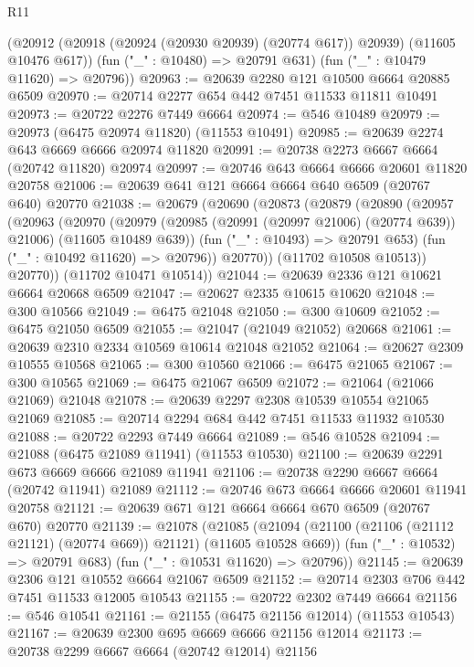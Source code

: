 \begin{lexlean}{R11}
\begin{coremodule}
{{{{{{{{{{{{{{{{{{{{{{{{{{{{{{{{{{{{{{{{{{{{{{{{{{{{{{{{{{{{{{{{{{{{{{{{{{{{{{{{{{      (@20912 (@20918 (@20924 (@20930 @20939) (@20774 @617)) @20939) (@11605 @10476 @617))
      (fun ("_" : @10480) => @20791 @631)
      (fun ("_" : @10479 @11620) => @20796))
@20963 := @20639 @2280 @121 @10500 @6664 @20885 @6509
@20970 := @20714 @2277 @654 @442 @7451 @11533 @11811 @10491
@20973 := @20722 @2276 @7449 @6664
@20974 := @546 @10489
@20979 := @20973 (@6475 @20974 @11820) (@11553 @10491)
@20985 := @20639 @2274 @643 @6669 @6666 @20974 @11820
@20991 := @20738 @2273 @6667 @6664 (@20742 @11820) @20974
@20997 := @20746 @643 @6664 @6666 @20601 @11820 @20758
@21006 := @20639 @641 @121 @6664 @6664 @640 @6509 (@20767 @640) @20770
@21038 := @20679
    (@20690
      (@20873
        (@20879
          (@20890
            (@20957
              (@20963
                (@20970
                  (@20979
                    (@20985 (@20991 (@20997 @21006) (@20774 @639)) @21006)
                    (@11605 @10489 @639))
                  (fun ("_" : @10493) => @20791 @653)
                  (fun ("_" : @10492 @11620) => @20796))
                @20770))
            (@11702 @10508 @10513))
          @20770))
      (@11702 @10471 @10514))
@21044 := @20639 @2336 @121 @10621 @6664 @20668 @6509
@21047 := @20627 @2335 @10615 @10620
@21048 := @300 @10566
@21049 := @6475 @21048
@21050 := @300 @10609
@21052 := @6475 @21050 @6509
@21055 := @21047 (@21049 @21052) @20668
@21061 := @20639 @2310 @2334 @10569 @10614 @21048 @21052
@21064 := @20627 @2309 @10555 @10568
@21065 := @300 @10560
@21066 := @6475 @21065
@21067 := @300 @10565
@21069 := @6475 @21067 @6509
@21072 := @21064 (@21066 @21069) @21048
@21078 := @20639 @2297 @2308 @10539 @10554 @21065 @21069
@21085 := @20714 @2294 @684 @442 @7451 @11533 @11932 @10530
@21088 := @20722 @2293 @7449 @6664
@21089 := @546 @10528
@21094 := @21088 (@6475 @21089 @11941) (@11553 @10530)
@21100 := @20639 @2291 @673 @6669 @6666 @21089 @11941
@21106 := @20738 @2290 @6667 @6664 (@20742 @11941) @21089
@21112 := @20746 @673 @6664 @6666 @20601 @11941 @20758
@21121 := @20639 @671 @121 @6664 @6664 @670 @6509 (@20767 @670) @20770
@21139 := @21078
    (@21085
      (@21094 (@21100 (@21106 (@21112 @21121) (@20774 @669)) @21121) (@11605 @10528 @669))
      (fun ("_" : @10532) => @20791 @683)
      (fun ("_" : @10531 @11620) => @20796))
@21145 := @20639 @2306 @121 @10552 @6664 @21067 @6509
@21152 := @20714 @2303 @706 @442 @7451 @11533 @12005 @10543
@21155 := @20722 @2302 @7449 @6664
@21156 := @546 @10541
@21161 := @21155 (@6475 @21156 @12014) (@11553 @10543)
@21167 := @20639 @2300 @695 @6669 @6666 @21156 @12014
@21173 := @20738 @2299 @6667 @6664 (@20742 @12014) @21156
}}}}}}}}}}}}}}}}}}}}}}}}}}}}}}}}}}}}}}}}}}}}}}}}}}}}}}}}}}}}}}}}}}}}}}}}}}}}}}}}}}
\end{coremodule}
\end{lexlean}
